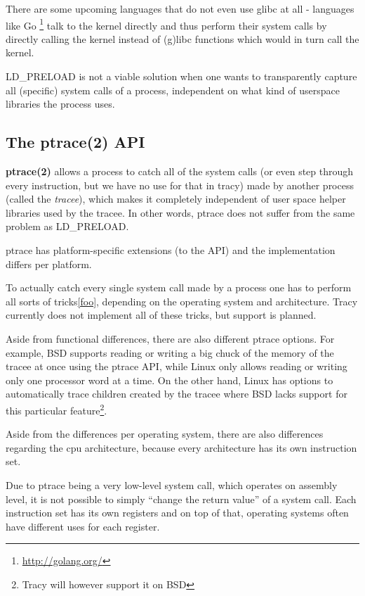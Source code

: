 \documentclass[a4paper, twoside, 10pt]{report}
\begin{document}
There are some upcoming languages that do not even use glibc at all - languages
like Go \footnote{\url{http://golang.org/}} talk to the kernel directly and
thus perform their system calls by directly calling the kernel instead of
(g)libc functions which would in turn call the kernel.

LD\_PRELOAD is not a viable solution when one wants to transparently capture
all (specific) system calls of a process, independent on what kind of
userspace libraries the process uses.

\subsection{The ptrace(2) API}

\textbf{ptrace(2)} allows a process to catch all of the system calls (or even
step through every instruction, but we have no use for that in tracy)
made by another process (called the \textit{tracee}), which makes it
completely independent of user space helper libraries used by the tracee.
In other words, ptrace does not suffer from the same problem as LD\_PRELOAD.

ptrace has platform-specific extensions (to the API) and the
implementation differs per platform.

To actually catch every single system call made by a process one has to
perform all sorts of tricks\ref{foo}, depending on the operating system and
architecture. Tracy currently does not implement all of these tricks, but
support is planned.

Aside from functional differences, there are also different ptrace options.
For example, BSD supports reading or writing a big chuck of the memory
of the tracee at once using the ptrace API, while Linux only allows
reading or writing only one processor word at a time.
On the other hand, Linux has options to automatically trace
children created by the tracee where BSD lacks support for
this particular feature\footnote{Tracy will however support it on BSD}.

Aside from the differences per operating system, there are also differences
regarding the cpu architecture, because every architecture has its own
instruction set.

Due to ptrace being a very low-level system call, which operates on assembly
level, it is not possible to simply ``change the return value'' of a system
call. Each instruction set has its own registers and on top of that, operating
systems often have different uses for each register.
\end{document}
